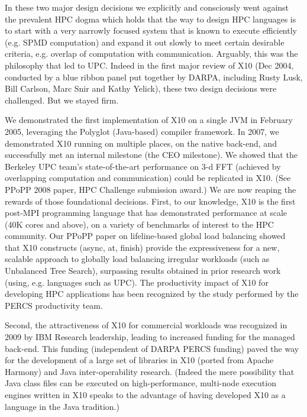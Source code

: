 In these two major design decisions we explicitly and consciously went
against the prevalent HPC dogma which holds that the way to design HPC
languages is to start with a very narrowly focused system that is
known to execute efficiently (e.g. SPMD computation) and expand it out
slowly to meet certain desirable criteria, e.g. overlap of computation
with communication. Arguably, this was the philosophy that led to
UPC. Indeed in the first major review of X10 (Dec 2004, conducted by a
blue ribbon panel put together by DARPA, including Rusty Lusk, Bill
Carlson, Marc Snir and Kathy Yelick), these two design decisions were
challenged. But we stayed firm. 

We demonstrated the first implementation of X10 on a single JVM in February 2005, leveraging the Polyglot (Java-based) compiler framework. In 2007, we demonstrated X10 running on multiple places, on the native back-end, and successfully met an internal milestone (the CEO milestone). We showed that the Berkeley UPC team's state-of-the-art performance on 3-d FFT (achieved by overlapping computation and communication) could be replicated in X10. (See PPoPP 2008 paper, HPC Challenge submission award.)
We are now reaping the rewards of those foundational decisions. First,
to our knowledge, X10 is the first post-MPI programming language that
has demonstrated performance at scale (40K cores and above), on a
variety of benchmarks of interest to the HPC community. Our PPoPP
paper on lifeline-based global load balancing showed that X10
constructs (async, at, finish) provide the expressiveness for a new,
scalable approach to globally load balancing irregular workloads (such
as Unbalanced Tree Search), surpassing results obtained in prior
research work (using, e.g. languages such as UPC). The productivity
impact of X10 for developing HPC applications has been recognized by
the study performed by the PERCS productivity team.  

Second, the attractiveness of X10 for commercial workloads was
recognized in 2009 by IBM Research leadership, leading to increased
funding for the managed back-end. This funding (independent of DARPA
PERCS funding)  paved the way for the development of a large set of
libraries in X10 (ported from Apache Harmony) and Java
inter-operability research. (Indeed the mere possibility that Java
class files can be executed on high-performance, multi-node execution
engines written in X10 speaks to the advantage of having developed X10
as a language in the Java tradition.) 

